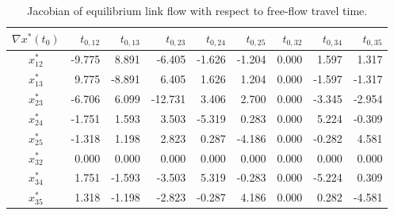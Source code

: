 \documentclass[a4paper,11pt]{article}
\begin{document}
\begin{table}[H]
\captionsetup{justification=centering}
\caption{Jacobian of equilibrium link flow with respect to free-flow travel time.}\label{tab:jac_x_t0}
\setlength\tabcolsep{8pt}
\centering
\begin{tabular}{crrrrrrrr}
 $\nabla x^*(t_0)$ & $t_{0,12}$ &  $t_{0,13}$      & $t_{0,23}$      & $t_{0,24}$ &     $t_{0,25}$      & $t_{0,32}$     & $t_{0,34}$      & $t_{0,35}$      \\
\toprule
$x^*_{12}$                         & -9.775                 & 8.891 & -6.405  & -1.626  & -1.204  & 0.000 & 1.597 & 1.317 \\
$x^*_{13}$                         & 9.775                & -8.891  & 6.405 & 1.626 & 1.204 & 0.000 & -1.597  & -1.317  \\
$x^*_{2 3}$                         & -6.706                 & 6.099 & -12.731 & 3.406 & 2.700 & 0.000 & -3.345  & -2.954  \\
$x^*_{24}$                         & -1.751                 & 1.593 & 3.503 & -5.319  & 0.283 & 0.000 & 5.224 & -0.309  \\
$x^*_{25}$                         & -1.318                 & 1.198 & 2.823 & 0.287 & -4.186  & 0.000 & -0.282  & 4.581 \\
$x^*_{32}$                         & 0.000                 & 0.000  & 0.000  & 0.000  & 0.000  & 0.000 & 0.000  & 0.000  \\
$x^*_{3 4}$                         & 1.751                & -1.593  & -3.503  & 5.319 & -0.283  & 0.000 & -5.224  & 0.309 \\
$x^*_{35}$                         & 1.318                & -1.198  & -2.823  & -0.287  & 4.186 & 0.000 & 0.282 & -4.581  \\
\bottomrule
\end{tabular}
\end{table}

\end{document}
